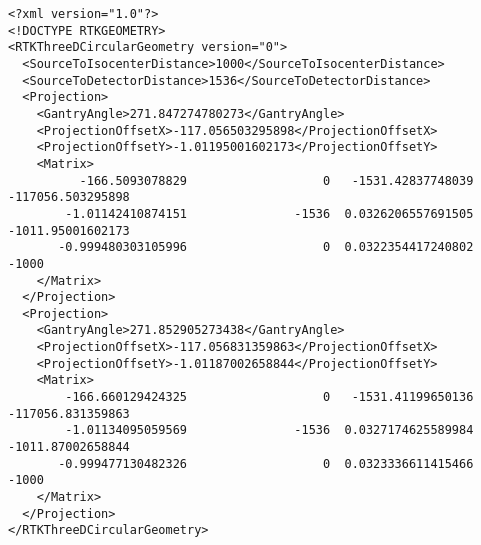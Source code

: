 \documentclass{article}
\begin{document}
\begin{verbatim}
<?xml version="1.0"?>
<!DOCTYPE RTKGEOMETRY>
<RTKThreeDCircularGeometry version="0">
  <SourceToIsocenterDistance>1000</SourceToIsocenterDistance>
  <SourceToDetectorDistance>1536</SourceToDetectorDistance>
  <Projection>
    <GantryAngle>271.847274780273</GantryAngle>
    <ProjectionOffsetX>-117.056503295898</ProjectionOffsetX>
    <ProjectionOffsetY>-1.01195001602173</ProjectionOffsetY>
    <Matrix>
          -166.5093078829                   0   -1531.42837748039   -117056.503295898
        -1.01142410874151               -1536  0.0326206557691505   -1011.95001602173
       -0.999480303105996                   0  0.0322354417240802               -1000
    </Matrix>
  </Projection>
  <Projection>
    <GantryAngle>271.852905273438</GantryAngle>
    <ProjectionOffsetX>-117.056831359863</ProjectionOffsetX>
    <ProjectionOffsetY>-1.01187002658844</ProjectionOffsetY>
    <Matrix>
        -166.660129424325                   0   -1531.41199650136   -117056.831359863
        -1.01134095059569               -1536  0.0327174625589984   -1011.87002658844
       -0.999477130482326                   0  0.0323336611415466               -1000
    </Matrix>
  </Projection>
</RTKThreeDCircularGeometry>
\end{verbatim}
\end{document}
